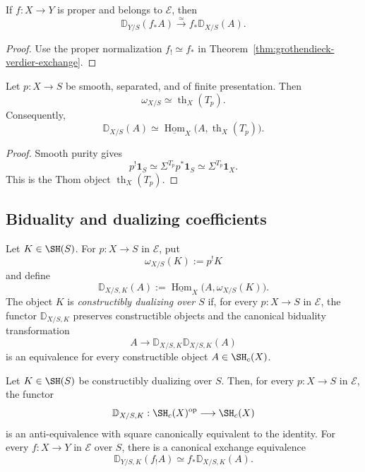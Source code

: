 \begin{corollary}
\label{cor:proper-verdier-exchange}
If \(f:X\to Y\) is proper and belongs to \(\mathcal E\), then
\[
    \mathbb D_{Y/S}(f_*A)
    \xrightarrow{\simeq}
    f_*\mathbb D_{X/S}(A).
\]
\end{corollary}

\begin{proof}
Use the proper normalization \(f_!\simeq f_*\) in
Theorem~\ref{thm:grothendieck-verdier-exchange}.
\end{proof}

\begin{proposition}
\label{prop:smooth-dualizing-object}
Let \(p:X\to S\) be smooth, separated, and of finite presentation.  Then
\[
    \omega_{X/S}
    \simeq
    \operatorname{th}_X(T_p).
\]
Consequently,
\[
    \mathbb D_{X/S}(A)
    \simeq
    \underline{\operatorname{Hom}}_X
    \bigl(
      A,
      \operatorname{th}_X(T_p)
    \bigr).
\]
\end{proposition}

\begin{proof}
Smooth purity gives
\[
    p^!\mathbf1_S
    \simeq
    \Sigma^{T_p}p^*\mathbf1_S
    \simeq
    \Sigma^{T_p}\mathbf1_X.
\]
This is the Thom object \(\operatorname{th}_X(T_p)\).
\end{proof}

\subsection{Biduality and dualizing coefficients}

\begin{definition}
\label{def:constructibly-dualizing-coefficient}
Let \(K\in\SH(S)\).  For \(p:X\to S\) in \(\mathcal E\), put
\[
    \omega_{X/S}(K):=p^!K
\]
and define
\[
    \mathbb D_{X/S,K}(A)
    :=
    \underline{\operatorname{Hom}}_X
    \bigl(
      A,
      \omega_{X/S}(K)
    \bigr).
\]
The object \(K\) is \emph{constructibly dualizing over \(S\)} if, for every
\(p:X\to S\) in \(\mathcal E\), the functor \(\mathbb D_{X/S,K}\) preserves
constructible objects and the canonical biduality transformation
\[
    A
    \longrightarrow
    \mathbb D_{X/S,K}\mathbb D_{X/S,K}(A)
\]
is an equivalence for every constructible object \(A\in\SH_c(X)\).
\end{definition}

\begin{proposition}
\label{prop:conditional-constructible-biduality}
Let \(K\in\SH(S)\) be constructibly dualizing over \(S\).  Then, for every
\(p:X\to S\) in \(\mathcal E\), the functor
\[
    \mathbb D_{X/S,K}:
    \SH_c(X)^{\mathrm{op}}
    \longrightarrow
    \SH_c(X)
\]
is an anti-equivalence with square canonically equivalent to the identity.
For every \(f:X\to Y\) in \(\mathcal E\) over \(S\), there is a
canonical exchange equivalence
\[
    \mathbb D_{Y/S,K}(f_!A)
    \simeq
    f_*\mathbb D_{X/S,K}(A).
\]
\end{proposition}

